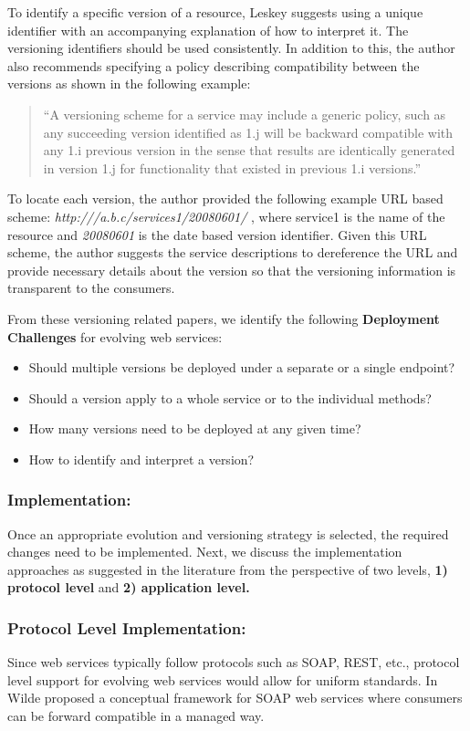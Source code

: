 \documentclass[runningheads,a4paper]{llncs}
\begin{document}
To identify a specific version of a resource, Leskey suggests using a unique identifier with an accompanying explanation of how to interpret it. The versioning identifiers should be used consistently. In addition to this, the author also recommends specifying a policy describing compatibility between the versions as shown in the following example:

\begin{quote}
``A versioning scheme for a service may include a generic policy, such as any succeeding version identified as 1.j will be backward compatible with any 1.i previous version in the sense that results are identically generated in version 1.j for functionality that existed in previous 1.i versions.''
\end{quote}

To locate each version, the author provided the following example URL based scheme: \emph{http:///a.b.c/services1/20080601/} , where service1 is the name of the resource and \emph{20080601} is the date based version identifier. Given this URL scheme, the author suggests the service descriptions to dereference the URL and provide necessary details about the version so that the versioning information is transparent to the consumers.

From these versioning related papers, we identify the following \textbf{Deployment Challenges} for evolving web services:

\begin{itemize}
  \item Should multiple versions be deployed under a separate or a single endpoint?
  \item Should a version apply to a whole service or to the individual methods?
  \item How many versions need to be deployed at any given time?
  \item How to identify and interpret a version?
\end{itemize}

\subsubsection{Implementation:}
Once an appropriate evolution and versioning strategy is selected, the required changes need to be implemented. Next, we discuss the implementation approaches as suggested in the literature from the perspective of two levels, \textbf{1) protocol level} and \textbf{2) application level.}

\subsubsection{Protocol Level Implementation:}
Since web services typically follow protocols such as SOAP, REST, etc., protocol level support for evolving web services would allow for uniform standards. In \cite{wilde2004semantically} Wilde proposed a conceptual framework for SOAP web services where consumers can be forward compatible in a managed way.
\end{document}
